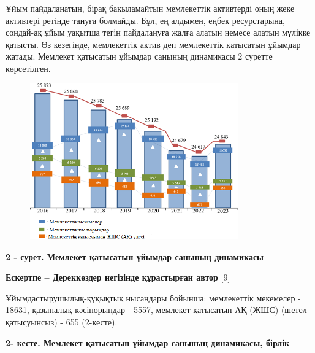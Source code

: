 {Ұйым пайдаланатын, бірақ бақыламайтын мемлекеттік активтерді оның жеке
активтері ретінде тануға болмайды. Бұл, ең алдымен, еңбек ресурстарына,
сондай-ақ ұйым уақытша тегін пайдалануға жалға алатын немесе алатын
мүлікке қатысты. Өз кезегінде, мемлекеттік актив деп мемлекеттік
қатысатын ұйымдар жатады. Мемлекет қатысатын ұйымдар санының динамикасы
2 суретте көрсетілген.

\begin{figure}[H]
	\centering
	\includegraphics[width=0.8\textwidth]{media/ekon2/image2}
	\caption*{}
\end{figure}


{\bfseries 2 - сурет. Мемлекет қатысатын ұйымдар санының динамикасы}

{\bfseries Ескертпе -- Дереккөздер негізінде құрастырған автор} {[}9{]}

Ұйымдастырушылық-құқықтық нысандары бойынша: мемлекеттік мекемелер -
18631, қазыналық кәсіпорындар - 5557, мемлекет қатысатын АҚ (ЖШС) (шетел
қатысуынсыз) - 655 (2-кесте).

{\bfseries 2- кесте. Мемлекет қатысатын ұйымдар санының динамикасы, бірлік}

}
